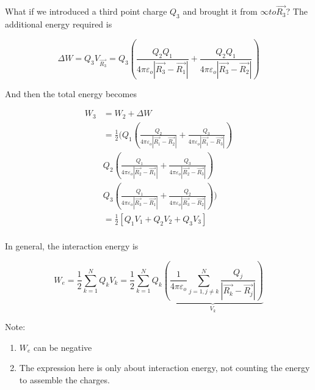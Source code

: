 \documentclass[10pt]{article}
\begin{document}
What if we introduced a third point charge $ Q_3 $ and brought it from $ \infty to \vec{R_3} $?
The additional energy required is

\begin{equation}
	\Delta W = Q_3 V_{\vec{R_3}} = Q_3 \left( 
	 \frac{Q_2Q_1}{4\pi \varepsilon_o |\vec{R_3} - \vec{R_1}| }+
	 \frac{Q_2Q_1}{4\pi \varepsilon_o |\vec{R_3} - \vec{R_2}| }
	\right)
\end{equation}

And then the total energy becomes 

\begin{equation}
	\begin{split}
		W_3 &= W_2 + \Delta W  \\
				&= \frac{1}{2} ( 
				 Q_1 \left( \frac{Q_2}{4\pi \varepsilon_o |\vec{R_1} - \vec{R_2}| } + \frac{Q_3}{4\pi \varepsilon_o |\vec{R_1} - \vec{R_3}| }  \right)   \\
				& Q_2 \left( \frac{Q_1}{4\pi \varepsilon_o |\vec{R_2} - \vec{R_1}| } + \frac{Q_3}{4\pi \varepsilon_o |\vec{R_2} - \vec{R_3}| }  \right)   \\
				& Q_3 \left( \frac{Q_1}{4\pi \varepsilon_o |\vec{R_3} - \vec{R_1}| } + \frac{Q_2}{4\pi \varepsilon_o |\vec{R_3} - \vec{R_2}| }  \right) )  \\
				&= \frac{1}{2} [Q_1 V_1 + Q_2 V_2 + Q_3 V_3] \\
	\end{split}
\end{equation}

\begin{theorem}
	In general, the interaction energy  is

	\begin{equation}
	W_e = \frac{1}{2} \sum^N_{k=1} Q_k V_k = \frac{1}{2} \sum^N_{k=1}Q_k \underbrace{(\frac{1}{4\pi \varepsilon_o} \sum^N_{j=1, j \neq k} \frac{Q_j}{|\vec{R_k} - \vec{R_j}|})}_{V_k}
	\end{equation}

	Note:
	\begin{enumerate}
		\item $ W_e $  can be negative
		\item The expression here is only about interaction energy, not counting the energy to assemble the charges.
	\end{enumerate}
	
\end{theorem}
\end{document}

